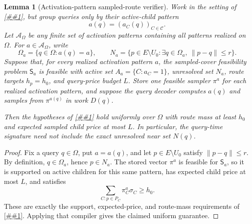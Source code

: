 \documentclass[10pt]{article}
\newcommand{\cref}[1]{\ref{##1}}
\newtheorem{lemma}[theorem]{Lemma}
\theoremstyle{definition}
\begin{document}
\begin{lemma}[Activation-pattern sampled-route verifier]
   \label{lem:activation-sampled-route-verifier}
   Work in the setting of \cref{lem:finite-sampled-route-verifier}, but group
   queries only by their active-child pattern
   \[
      a(q)=(a_C(q))_{C\in\mathcal C}.
   \]
   Let \(\mathcal A_\Omega\) be any finite set of activation patterns
   containing all patterns realized on \(\Omega\).  For
   \(a\in\mathcal A_\Omega\), write
   \[
      \Omega_a=\{q\in\Omega:a(q)=a\},
      \qquad
      N_a=
      \{p\in E\setminus U_0:\exists q\in\Omega_a,\ \|p-q\|\le r\}.
   \]
   Suppose that, for every realized activation pattern \(a\), the
   sampled-cover feasibility problem \(\mathsf S_a\) is feasible with active
   set \(A_a=\{C:a_C=1\}\), unresolved set \(N_a\), route targets
   \(h_p=h_0\), and query-price budget \(L\).  Store one feasible sampler
   \(\pi^a\) for each realized activation pattern, and suppose the query
   decoder computes \(a(q)\) and samples from \(\pi^{a(q)}\) in work \(D(q)\).

   Then the hypotheses of \cref{lem:sampled-priced-cover} hold uniformly over
   \(\Omega\) with route mass at least \(h_0\) and expected sampled child price
   at most \(L\).  In particular, the query-time signature need not include
   the exact unresolved near set \(N(q)\).
\end{lemma}

\begin{proof}
   Fix a query \(q\in\Omega\), put \(a=a(q)\), and let
   \(p\in E\setminus U_0\) satisfy \(\|p-q\|\le r\).  By definition,
   \(q\in\Omega_a\), hence \(p\in N_a\).  The stored vector \(\pi^a\) is
   feasible for \(\mathsf S_a\), so it is supported on active children for
   this same pattern, has expected child price at most \(L\), and satisfies
   \[
      \sum_{C:p\in P_C}\pi^a_C\sigma_C\ge h_0 .
   \]
   These are exactly the support, expected-price, and route-mass requirements
   of \cref{lem:sampled-priced-cover}.  Applying that compiler gives the
   claimed uniform guarantee.
\end{proof}
\end{document}
